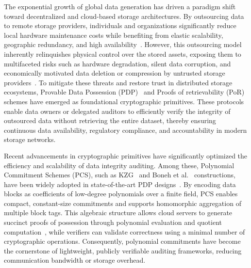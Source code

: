 \documentclass[lettersize,journal]{IEEEtran}
\begin{document}
The exponential growth of global data generation has driven a paradigm shift toward decentralized and cloud-based storage architectures. By outsourcing data to remote storage providers, individuals and organizations significantly reduce local hardware maintenance costs while benefiting from elastic scalability, geographic redundancy, and high availability~\cite{Shah2007Auditing,Sookhak2015Survey}. However, this outsourcing model inherently relinquishes physical control over the stored assets, exposing them to multifaceted risks such as hardware degradation, silent data corruption, and economically motivated data deletion or compression by untrusted storage providers~\cite{Deswarte2004RIC,Schwarz2006Store}. To mitigate these threats and restore trust in distributed storage ecosystems, Provable Data Possession (PDP)~\cite{Ateniese2007PDP,Bowers2009HAIL,Stefanov2012Iris,Ateniese2011RDC} and Proofs of retrievability (PoR)~\cite{Juels2007POR,Le2023Porla} schemes have emerged as foundational cryptographic primitives. These protocols enable data owners or delegated auditors to efficiently verify the integrity of outsourced data without retrieving the entire dataset, thereby ensuring continuous data availability, regulatory compliance, and accountability in modern storage networks.

Recent advancements in cryptographic primitives have significantly optimized the efficiency and scalability of data integrity auditing. Among these, Polynomial Commitment Schemes (PCS), such as KZG~\cite{Kate2010KZG} and Boneh et al.~\cite{Boneh2020PCS} constructions, have been widely adopted in state-of-the-art PDP designs~\cite{YuTC25,ZhangTPDS23}. By encoding data blocks as coefficients of low-degree polynomials over a finite field, PCS enables compact, constant-size commitments and supports homomorphic aggregation of multiple block tags. This algebraic structure allows cloud servers to generate succinct proofs of possession through polynomial evaluation and quotient computation~\cite{Dumas2023VESPo,Yu2024EDASVIC}, while verifiers can validate correctness using a minimal number of cryptographic operations. Consequently, polynomial commitments have become the cornerstone of lightweight, publicly verifiable auditing frameworks, reducing communication bandwidth or storage overhead. 
\end{document}
